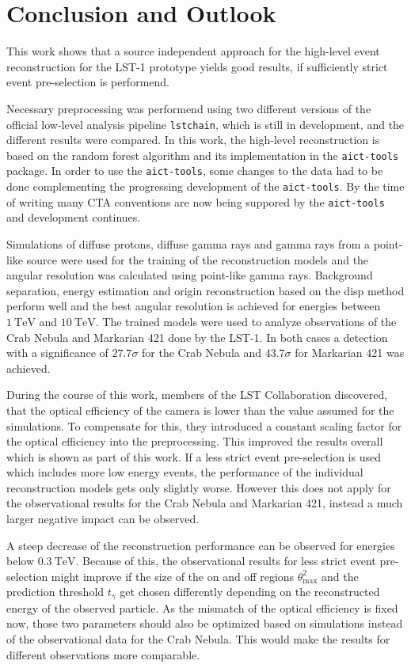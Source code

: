\chapter{Conclusion and Outlook}
This work shows that a source independent approach for the high-level event reconstruction for the LST-1 prototype yields good results, 
if sufficiently strict event pre-selection is performend.

Necessary preprocessing was performend using two different versions of the official low-level analysis pipeline \texttt{lstchain}, which is still 
in development, and the different results were compared.
In this work, the high-level reconstruction is based on the random forest algorithm and its implementation in the \texttt{aict-tools} package.
In order to use the \texttt{aict-tools}, some changes to the data had to be done complementing the progressing development of the \texttt{aict-tools}.
By the time of writing many CTA conventions are now being suppored by the \texttt{aict-tools} and development continues.

Simulations of diffuse protons, diffuse gamma rays and gamma rays from a point-like source were used for the training of the reconstruction models and
the angular resolution was calculated using point-like gamma rays.
Background separation, energy estimation and origin reconstruction based on the disp method perform well and the best angular resolution is 
achieved for energies between $\SI{1}{\tera\electronvolt}$ and $\SI{10}{\tera\electronvolt}$.
The trained models were used to analyze observations of the Crab Nebula and Markarian 421 done by the LST-1.
In both cases a detection with a significance of $\num{27.7} \sigma$ for the Crab Nebula and $\num{43.7} \sigma$ for Markarian 421 was achieved.

During the course of this work, members of the LST Collaboration discovered, that the optical efficiency of the camera is lower than 
the value assumed for the simulations.
To compensate for this, they introduced a constant scaling factor for the optical efficiency into the preprocessing.
This improved the results overall which is shown as part of this work.
If a less strict event pre-selection is used which includes more low energy events, the performance of the individual reconstruction models gets only slightly worse.
However this does not apply for the observational results for the Crab Nebula and Markarian 421, instead a much larger negative impact can be observed.

A steep decrease of the reconstruction performance can be observed for energies below $\SI{0.3}{\tera\electronvolt}$.
Because of this, the observational results for less strict event pre-selection might improve if the size of the on and off regions $\theta_\text{max}^2$ and the
prediction threshold $t_\gamma$ get chosen differently depending on the reconstructed energy of the observed particle.
As the mismatch of the optical efficiency is fixed now, those two parameters should also be optimized based on simulations instead of the observational data 
for the Crab Nebula.
This would make the results for different observations more comparable.

